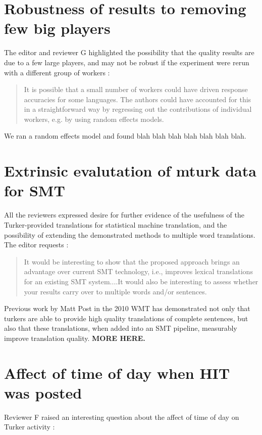 \documentclass[11pt]{article}
\begin{document}
\section{Robustness of results to removing few big players}

The editor and reviewer G highlighted the possibility that the quality results are due to a few large players, and may not be robust if the experiment were rerun with a different group of workers : 
\begin{quote}
It is possible that a small number of workers could have driven response accuracies for some languages. The authors could have accounted for this in a straightforward way by regressing out the contributions of individual workers, e.g. by using random effects models.
\end{quote}
We ran a random effects model and found blah blah blah blah blah blah blah. 

\section{Extrinsic evalutation of mturk data for SMT}

All the reviewers expressed desire for further evidence of the usefulness of the Turker-provided translations for statistical machine translation, and the possibility of extending the demonstrated methods to multiple word translations. The editor requests :

\begin{quote}
It would be interesting to show that the proposed approach brings an advantage over current SMT technology, i.e., improves lexical translations for an existing SMT system....It would also be interesting to assess whether your results carry over to multiple words and/or sentences. 
\end{quote}

Previous work by Matt Post in the 2010 WMT has demonstrated not only that turkers are able to provide high quality translations of complete sentences, but also that these translations, when added into an SMT pipeline, measurably improve translation quality. \textbf{MORE HERE.}

\section{Affect of time of day when HIT was posted}

Reviewer F raised an interesting question about the affect of time of day on Turker activity : 
\end{document}
